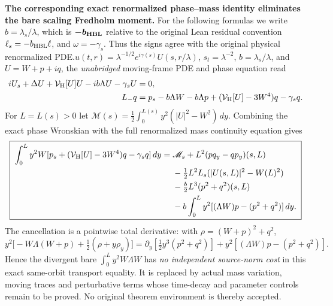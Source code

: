\documentclass[11pt]{amsart}
\begin{document}
\medskip
\noindent\textbf{The corresponding exact renormalized phase--mass
identity eliminates the bare scaling Fredholm moment.}
For the following formulas we write \(b=\lambda_s/\lambda\), which is \(\boldsymbol{-b_{\rm HBL}}\) relative to the original Lean residual convention \(\ell_s=-b_{\rm HBL}\ell\), and \(\omega=-\gamma_s\). Thus the signs agree with the original physical renormalized PDE.\nFor \(u(t,r)=\lambda^{-1/2}e^{i\gamma(s)}U(s,r/\lambda)\),
\(s_t=\lambda^{-2}\), \(b=\lambda_s/\lambda\), and
\(U=W+p+iq\), the \emph{unabridged} moving-frame PDE and
phase equation read
\[
 \begin{aligned}
 iU_s+\Delta U+\mathcal V_{\rm H}[U]U
   -ib\Lambda U-\gamma_sU&=0,\\
 L_-q&=p_s-b\Lambda W-b\Lambda p
  +(\mathcal V_{\rm H}[U]-3W^4)q-\gamma_sq.
 \end{aligned}
\]
For \(L=L(s)>0\) let
\(\mathscr M(s)=\frac12\int_0^{L(s)}y^2(|U|^2-W^2)\,dy\).
Combining the exact phase Wronskian with the full
renormalized mass continuity equation gives
\[
 \boxed{\;
 \begin{aligned}
 \int_0^L y^2W
 [p_s+(\mathcal V_{\rm H}[U]-3W^4)q-\gamma_sq]\,dy
 ={}&\mathscr M_s+L^2(pq_y-qp_y)(s,L)\\
 &-\tfrac12L^2L_s(|U(s,L)|^2-W(L)^2)\\
 &-\tfrac b2L^3(p^2+q^2)(s,L)\\
 &-b\int_0^L y^2[(\Lambda W)p-(p^2+q^2)]\,dy.
 \end{aligned}\;}
\]
The cancellation is a pointwise total derivative: with
\(\rho=(W+p)^2+q^2\),
\[
 y^2\bigl[-W\Lambda(W+p)+\tfrac12(\rho+y\rho_y)\bigr]
 =\partial_y[\tfrac12y^3(p^2+q^2)]
  +y^2[(\Lambda W)p-(p^2+q^2)].
\]
Hence the divergent bare \(\int_0^L y^2W\Lambda W\)
has \emph{no independent source-norm cost} in this exact
same-orbit transport equality. It is replaced by actual
mass variation, moving traces and perturbative terms whose
time-decay and parameter controls remain to be proved.
No original theorem environment is thereby accepted.

\end{document}
